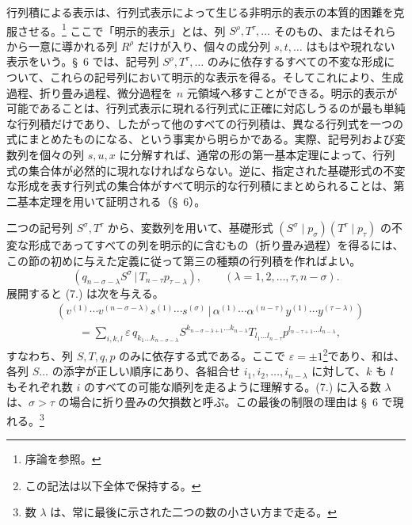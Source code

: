 \documentclass[11pt]{jlreq}
\newcommand{\pair}[2]{(#1\,|\,#2)}
\newcommand{\eps}{\varepsilon}
\begin{document}
行列積による表示は、行列式表示によって生じる非明示的表示の本質的困難を克服させる。\footnote{序論を参照。} ここで「明示的表示」とは、列 $S^\rho,T^\tau,\ldots$ そのもの、またはそれらから一意に導かれる列 $R^\rho$ だけが入り、個々の成分列 $s,t,\ldots$ はもはや現れない表示をいう。\S\ 6 では、記号列 $S^\rho,T^\tau,\ldots$ のみに依存するすべての不変な形成について、これらの記号列において明示的な表示を得る。そしてこれにより、生成過程、折り畳み過程、微分過程を $n$ 元領域へ移すことができる。明示的表示が可能であることは、行列式表示に現れる行列式に正確に対応しうるのが最も単純な行列積だけであり、したがって他のすべての行列積は、異なる行列式を一つの式にまとめたものになる、という事実から明らかである。実際、記号列および変数列を個々の列 $s,u,x$ に分解すれば、通常の形の第一基本定理によって、行列式の集合体が必然的に現れなければならない。逆に、指定された基礎形式の不変な形成を表す行列式の集合体がすべて明示的な行列積にまとめられることは、第二基本定理を用いて証明される（\S\ 6）。

二つの記号列 $S^\sigma,T^\tau$ から、変数列を用いて、基礎形式 $(S^\sigma\mid p_\sigma)(T^\tau\mid p_\tau)$ の不変な形成であってすべての列を明示的に含むもの（折り畳み過程）を得るには、この節の初めに与えた定義に従って第三の種類の行列積を作ればよい。
\begin{equation}
 \pair{q_{n-\sigma-\lambda}S^\sigma}{T_{n-\tau}p_{\tau-\lambda}},
 \qquad (\lambda=1,2,\ldots,\tau,n-\sigma).
\tag{7}
\end{equation}
展開すると (7.) は次を与える。
\begin{equation}
\begin{aligned}
&\pair{v^{(1)}\cdots v^{(n-\sigma-\lambda)}s^{(1)}\cdots s^{(\sigma)}}
       {\alpha^{(1)}\cdots\alpha^{(n-\tau)}y^{(1)}\cdots y^{(\tau-\lambda)}} \\
&\qquad =\sum_{i,k,l}\eps\,q_{k_1\ldots k_{n-\sigma-\lambda}}
 S^{k_{n-\sigma-\lambda+1}\ldots k_{n-\lambda}}
 T_{l_1\ldots l_{n-\tau}}
 p^{l_{n-\tau+1}\ldots l_{n-\lambda}},
\end{aligned}
\tag{8}
\end{equation}
すなわち、列 $S,T,q,p$ のみに依存する式である。ここで $\eps=\pm1$\footnote{この記法は以下全体で保持する。}であり、和は、各列 $S\ldots$ の添字が正しい順序にあり、各組合せ $i_1,i_2,\ldots,i_{n-\lambda}$ に対して、$k$ も $l$ もそれぞれ数 $i$ のすべての可能な順列を走るように理解する。(7.) に入る数 $\lambda$ は、$\sigma>\tau$ の場合に折り畳みの欠損数と呼ぶ。この最後の制限の理由は \S\ 6 で現れる。\footnote{数 $\lambda$ は、常に最後に示された二つの数の小さい方まで走る。}
\end{document}
